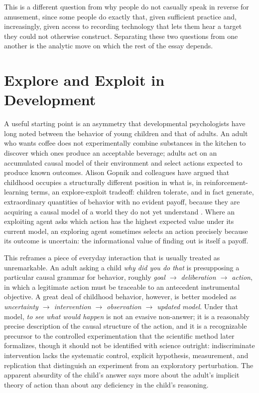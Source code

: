 \documentclass[11pt]{article}
\begin{document}
This is a different question from why people do not casually speak in reverse for amusement, since some people do exactly that, given sufficient practice and, increasingly, given access to recording technology that lets them hear a target they could not otherwise construct. Separating these two questions from one another is the analytic move on which the rest of the essay depends.

\section{Explore and Exploit in Development}

A useful starting point is an asymmetry that developmental psychologists have long noted between the behavior of young children and that of adults. An adult who wants coffee does not experimentally combine substances in the kitchen to discover which ones produce an acceptable beverage; adults act on an accumulated causal model of their environment and select actions expected to produce known outcomes. Alison Gopnik and colleagues have argued that childhood occupies a structurally different position in what is, in reinforcement-learning terms, an explore-exploit tradeoff: children tolerate, and in fact generate, extraordinary quantities of behavior with no evident payoff, because they are acquiring a causal model of a world they do not yet understand \citep{gopnik1999,gopnik2004,gopnik2020}. Where an exploiting agent asks which action has the highest expected value under its current model, an exploring agent sometimes selects an action precisely because its outcome is uncertain: the informational value of finding out is itself a payoff.

This reframes a piece of everyday interaction that is usually treated as unremarkable. An adult asking a child \emph{why did you do that} is presupposing a particular causal grammar for behavior, roughly \emph{goal $\rightarrow$ deliberation $\rightarrow$ action}, in which a legitimate action must be traceable to an antecedent instrumental objective. A great deal of childhood behavior, however, is better modeled as \emph{uncertainty $\rightarrow$ intervention $\rightarrow$ observation $\rightarrow$ updated model}. Under that model, \emph{to see what would happen} is not an evasive non-answer; it is a reasonably precise description of the causal structure of the action, and it is a recognizable precursor to the controlled experimentation that the scientific method later formalizes, though it should not be identified with science outright: indiscriminate intervention lacks the systematic control, explicit hypothesis, measurement, and replication that distinguish an experiment from an exploratory perturbation. The apparent absurdity of the child's answer says more about the adult's implicit theory of action than about any deficiency in the child's reasoning.
\end{document}
